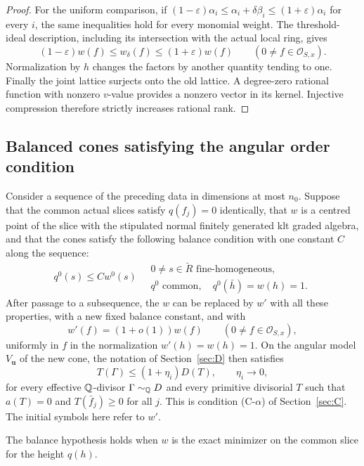 \begin{proof}
For the uniform comparison, if
$(1-\varepsilon)\alpha_i\le\alpha_i+\delta\beta_i
\le(1+\varepsilon)\alpha_i$ for every $i$, the same inequalities
hold for every monomial weight.  The threshold-ideal description,
including its intersection with the actual local ring, gives
\[
 (1-\varepsilon)w(f)\le w_\delta(f)
                  \le(1+\varepsilon)w(f)
 \qquad(0\ne f\in\mathcal O_{S,x}).
\]
Normalization by $h$ changes the factors by another quantity
tending to one.  Finally the joint lattice surjects onto the old
lattice.  A degree-zero rational function with nonzero $v$-value
provides a nonzero vector in its kernel.  Injective compression
therefore strictly increases rational rank.
\end{proof}

\subsection{Balanced cones satisfying the angular order condition}

\begin{proposition}\label{prop:F-refinement}
Consider a sequence of the preceding data in dimensions at most
$n_0$.  Suppose that the common actual slices satisfy
$q(f_j)=0$ identically, that $w$ is a centred point of the slice
with the stipulated normal finitely generated klt graded algebra,
and that the cones satisfy the following balance condition with
one constant $C$ along the sequence:
\begin{equation}\label{eq:F-balance}
 q^0(s)\le Cw^0(s)
 \quad\begin{gathered}
 0\ne s\in\breve R\text{ fine-homogeneous},\\[-2pt]
 q^0\text{ common},\quad q^0(\bar h)=w(h)=1.
 \end{gathered}
\end{equation}
After passage to a subsequence, the $w$ can be replaced by $w'$
with all these properties, with a new fixed balance constant,
and with
\begin{equation}\label{eq:F-refinement-comparison}
 w'(f)=(1+o(1))w(f)
 \qquad(0\ne f\in\mathcal O_{S,x}),
\end{equation}
uniformly in $f$ in the normalization $w'(h)=w(h)=1$.
On the angular model $V_{\mathbf u}$ of the new cone, the
notation of Section~\ref{sec:D} then satisfies
\begin{equation}\label{eq:F-angular-order}
 T(\Gamma)\le(1+\eta_i)D(T),\qquad \eta_i\longrightarrow0,
\end{equation}
for every effective $\mathbb Q$-divisor $\Gamma\sim_\mathbb Q D$ and every
primitive divisorial $T$ such that
$a(T)=0$ and $T(\bar f_j)\ge0$ for all $j$.
This is condition \textup{(C-$\alpha$)} of Section~\ref{sec:C}.
The initial symbols here refer to $w'$.

The balance hypothesis holds when $w$ is the exact minimizer
on the common slice for the height $q(h)$.
\end{proposition}

